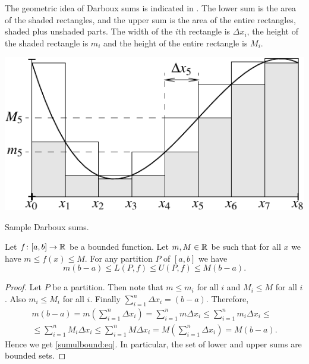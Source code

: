 The geometric idea of Darboux sums is indicated in
.  The lower sum is the area of the shaded
rectangles, and the upper sum is the area of the entire
rectangles, shaded plus unshaded parts.  The width of the $i$th rectangle is $\Delta x_i$,
the height of the shaded rectangle is $m_i$ and the height
of the entire rectangle is $M_i$.

\begin{myfigureht}
\includegraphics{figures/darbouxfig}
\caption{Sample Darboux sums.\label{darbouxfig}}
\end{myfigureht}

\begin{prop} \label{sumulbound:prop}
Let $f \colon [a,b] \to {\mathbb{R}}$ be a bounded function.  Let $m, M \in {\mathbb{R}}$ be 
such that for all $x$ we have $m \leq f(x) \leq M$.  For any partition $P$ of $[a,b]$
we have
\begin{equation}
\label{sumulbound:eq}
m(b-a) \leq
L(P,f) \leq U(P,f)
\leq M(b-a) .
\end{equation}
\end{prop}

\begin{proof}
Let $P$ be a partition.  Then note that $m \leq m_i$ for all $i$ and
$M_i \leq M$ for all $i$.  Also $m_i \leq M_i$ for all $i$.  Finally
$\sum_{i=1}^n \Delta x_i = (b-a)$.  Therefore,
\begin{multline*}
m(b-a) =
m \left( \sum_{i=1}^n \Delta x_i \right)
=
\sum_{i=1}^n m \Delta x_i
\leq
\sum_{i=1}^n m_i \Delta x_i 
\leq
\\
\leq
\sum_{i=1}^n M_i \Delta x_i
\leq
\sum_{i=1}^n M \Delta x_i 
=
M \left( \sum_{i=1}^n \Delta x_i \right)
=
M(b-a) .
\end{multline*}
Hence we get \eqref{sumulbound:eq}.  In particular, the set of lower and
upper sums are bounded sets.
\end{proof}

